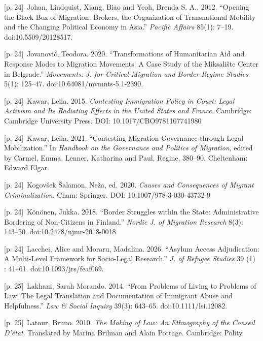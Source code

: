 \documentclass[10pt,a4paper]{article}
\begin{document}
{\scriptsize\color{gray} [p. 24]}\ Johan, Lindquist, Xiang, Biao and Yeoh, Brenda S. A.. 2012. “Opening the Black Box of Migration: Brokers, the Organization of Transnational Mobility and the Changing Political Economy in Asia.” \textit{Pacific Affairs} 85(1): 7–19. doi:10.5509/20128517.\par
{\scriptsize\color{gray} [p. 24]}\ Jovanović, Teodora. 2020. “Transformations of Humanitarian Aid and Response Modes to Migration Movements: A Case Study of the Miksalište Center in Belgrade.” \textit{Movements: J. for Critical Migration and Border Regime Studies} 5(1): 125–47. doi:10.64081/mvmnts-5.1-2390.\par
{\scriptsize\color{gray} [p. 24]}\ Kawar, Leila. 2015. \textit{Contesting Immigration Policy in Court: Legal Activism and Its Radiating Effects in the United States and France}. Cambridge: Cambridge University Press. DOI: 10.1017/CBO9781107741980\par
{\scriptsize\color{gray} [p. 24]}\ Kawar, Leila. 2021. “Contesting Migration Governance through Legal Mobilization.” In \textit{Handbook on the Governance and Politics of Migration}, edited by Carmel, Emma, Lenner, Katharina and Paul, Regine, 380–90. Cheltenham: Edward Elgar.\par
{\scriptsize\color{gray} [p. 24]}\ Kogovšek Šalamon, Neža, ed. 2020. \textit{Causes and Consequences of Migrant Criminalization}. Cham: Springer. DOI: 10.1007/978-3-030-43732-9\par
{\scriptsize\color{gray} [p. 24]}\ Könönen, Jukka. 2018. “Border Struggles within the State: Administrative Bordering of Non-Citizens in Finland.” \textit{Nordic J. of Migration Research} 8(3): 143–50. doi:10.2478/njmr-2018-0018.\par
{\scriptsize\color{gray} [p. 24]}\ Lacchei, Alice and Moraru, Madalina. 2026. “Asylum Access Adjudication: A Multi-Level Framework for Socio-Legal Research.” \textit{J. of Refugee Studies} 39 (1) : 41–61. doi:10.1093/jrs/feaf069.\par
{\scriptsize\color{gray} [p. 25]}\ Lakhani, Sarah Morando. 2014. “From Problems of Living to Problems of Law: The Legal Translation and Documentation of Immigrant Abuse and Helpfulness.” \textit{Law \& Social Inquiry} 39(3): 643–65. doi:10.1111/lsi.12082.\par
{\scriptsize\color{gray} [p. 25]}\ Latour, Bruno. 2010. \textit{The Making of Law: An Ethnography of the Conseil D’état}. Translated by Marina Brilman and Alain Pottage. Cambridge: Polity.\par
\end{document}
